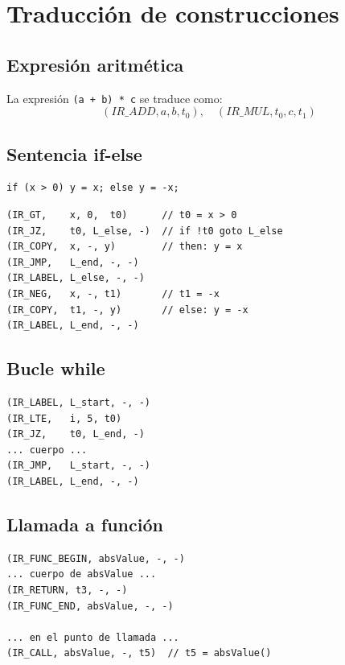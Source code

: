 \section{Traducción de construcciones}

\subsection{Expresión aritmética}

\begin{ejemplo}
La expresión \texttt{(a + b) * c} se traduce como:
\[
  (IR\_ADD, a, b, t_0),\quad (IR\_MUL, t_0, c, t_1)
\]
\end{ejemplo}

\subsection{Sentencia if-else}

\begin{lstlisting}[style=java, caption={if-else en código fuente}]
if (x > 0) y = x; else y = -x;
\end{lstlisting}

\begin{verbatim}
(IR_GT,    x, 0,  t0)      // t0 = x > 0
(IR_JZ,    t0, L_else, -)  // if !t0 goto L_else
(IR_COPY,  x, -, y)        // then: y = x
(IR_JMP,   L_end, -, -)
(IR_LABEL, L_else, -, -)
(IR_NEG,   x, -, t1)       // t1 = -x
(IR_COPY,  t1, -, y)       // else: y = -x
(IR_LABEL, L_end, -, -)
\end{verbatim}

\subsection{Bucle while}

\begin{verbatim}
(IR_LABEL, L_start, -, -)
(IR_LTE,   i, 5, t0)
(IR_JZ,    t0, L_end, -)
... cuerpo ...
(IR_JMP,   L_start, -, -)
(IR_LABEL, L_end, -, -)
\end{verbatim}

\subsection{Llamada a función}

\begin{verbatim}
(IR_FUNC_BEGIN, absValue, -, -)
... cuerpo de absValue ...
(IR_RETURN, t3, -, -)
(IR_FUNC_END, absValue, -, -)

... en el punto de llamada ...
(IR_CALL, absValue, -, t5)  // t5 = absValue()
\end{verbatim}

